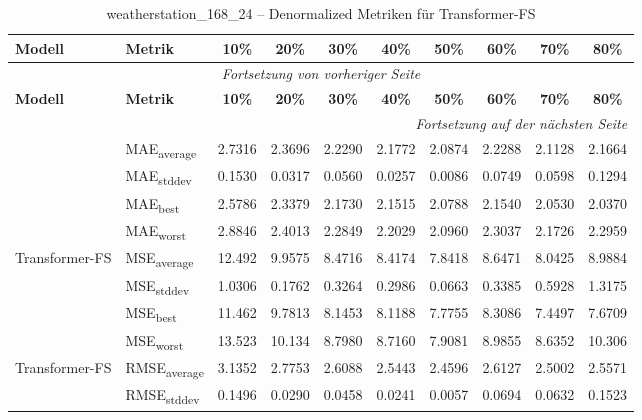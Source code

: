 {\small
\begin{longtable}{l l c c c c c c c c}
    \toprule
    \textbf{Modell} & \textbf{Metrik} & \textbf{10\%} & \textbf{20\%} & \textbf{30\%} & \textbf{40\%} & \textbf{50\%} & \textbf{60\%} & \textbf{70\%} & \textbf{80\%} \\
    \midrule
    \endfirsthead
    \multicolumn{10}{c}{\textit{Fortsetzung von vorheriger Seite}} \\
    \toprule
    \textbf{Modell} & \textbf{Metrik} & \textbf{10\%} & \textbf{20\%} & \textbf{30\%} & \textbf{40\%} & \textbf{50\%} & \textbf{60\%} & \textbf{70\%} & \textbf{80\%} \\
    \midrule
    \endhead
    \midrule
    \multicolumn{10}{r}{\textit{Fortsetzung auf der nächsten Seite}} \\
    \midrule
    \endfoot
    \bottomrule
    \caption{weatherstation_168_24 -- Denormalized Metriken für Transformer-FS}
    \label{tab:weatherstation_168_24_denormalized_transformer-fs}
    \endlastfoot
\multirow{4}{*}{Transformer-FS} & MAE\textsubscript{average} & 2.7316 & 2.3696 & 2.2290 & 2.1772 & 2.0874 & 2.2288 & 2.1128 & 2.1664 \\
 & MAE\textsubscript{stddev} & 0.1530 & 0.0317 & 0.0560 & 0.0257 & 0.0086 & 0.0749 & 0.0598 & 0.1294 \\
 & MAE\textsubscript{best} & 2.5786 & 2.3379 & 2.1730 & 2.1515 & 2.0788 & 2.1540 & 2.0530 & 2.0370 \\
 & MAE\textsubscript{worst} & 2.8846 & 2.4013 & 2.2849 & 2.2029 & 2.0960 & 2.3037 & 2.1726 & 2.2959 \\
\cmidrule(lr){2-10}
\multirow{4}{*}{Transformer-FS} & MSE\textsubscript{average} & 12.492 & 9.9575 & 8.4716 & 8.4174 & 7.8418 & 8.6471 & 8.0425 & 8.9884 \\
 & MSE\textsubscript{stddev} & 1.0306 & 0.1762 & 0.3264 & 0.2986 & 0.0663 & 0.3385 & 0.5928 & 1.3175 \\
 & MSE\textsubscript{best} & 11.462 & 9.7813 & 8.1453 & 8.1188 & 7.7755 & 8.3086 & 7.4497 & 7.6709 \\
 & MSE\textsubscript{worst} & 13.523 & 10.134 & 8.7980 & 8.7160 & 7.9081 & 8.9855 & 8.6352 & 10.306 \\
\cmidrule(lr){2-10}
\multirow{4}{*}{Transformer-FS} & RMSE\textsubscript{average} & 3.1352 & 2.7753 & 2.6088 & 2.5443 & 2.4596 & 2.6127 & 2.5002 & 2.5571 \\
 & RMSE\textsubscript{stddev} & 0.1496 & 0.0290 & 0.0458 & 0.0241 & 0.0057 & 0.0694 & 0.0632 & 0.1523 \\

\end{longtable}}
